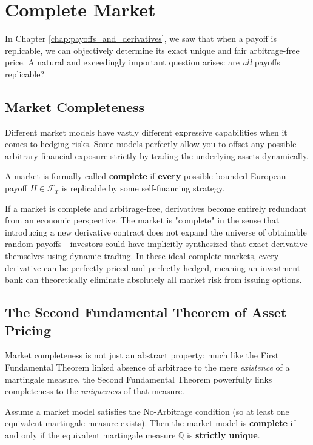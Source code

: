 \chapter{Complete Market}
\label{chap:complete_market}

In Chapter \ref{chap:payoffs_and_derivatives}, we saw that when a payoff is replicable, we can objectively determine its exact unique and fair arbitrage-free price. A natural and exceedingly important question arises: are \textit{all} payoffs replicable?

\section{Market Completeness}

Different market models have vastly different expressive capabilities when it comes to hedging risks. Some models perfectly allow you to offset any possible arbitrary financial exposure strictly by trading the underlying assets dynamically. 

\begin{definition}
A market is formally called \textbf{complete} if \textbf{every} possible bounded European payoff $H \in \mathcal{F}_T$ is replicable by some self-financing strategy.
\end{definition}

If a market is complete and arbitrage-free, derivatives become entirely redundant from an economic perspective. The market is "complete" in the sense that introducing a new derivative contract does not expand the universe of obtainable random payoffs—investors could have implicitly synthesized that exact derivative themselves using dynamic trading. In these ideal complete markets, every derivative can be perfectly priced and perfectly hedged, meaning an investment bank can theoretically eliminate absolutely all market risk from issuing options.

\section{The Second Fundamental Theorem of Asset Pricing}

Market completeness is not just an abstract property; much like the First Fundamental Theorem linked absence of arbitrage to the mere \textit{existence} of a martingale measure, the Second Fundamental Theorem powerfully links completeness to the \textit{uniqueness} of that measure.

\begin{theorem}
Assume a market model satisfies the No-Arbitrage condition (so at least one equivalent martingale measure exists). Then the market model is \textbf{complete} if and only if the equivalent martingale measure $\mathbb{Q}$ is \textbf{strictly unique}.
\end{theorem}

